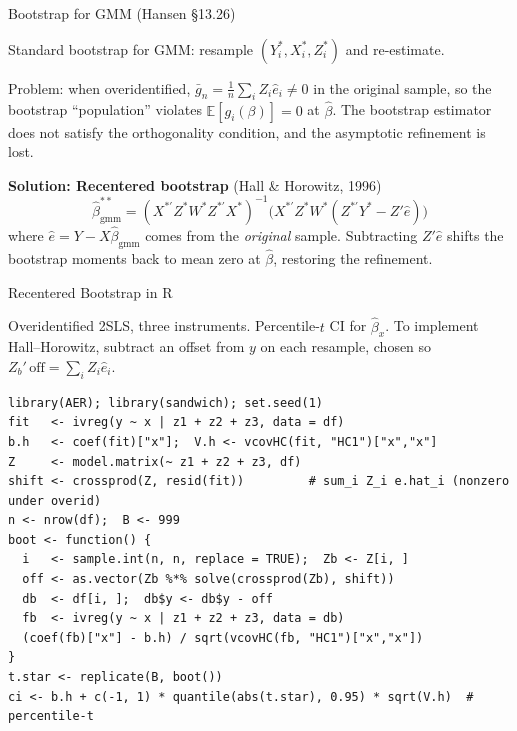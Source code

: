 \documentclass[aspectratio=169, handout]{beamer}
\numberwithin{equation}{section}
\begin{document}
\begin{frame}{Bootstrap for GMM (Hansen \S13.26)}

Standard bootstrap for GMM: resample $(Y_i^*, X_i^*, Z_i^*)$ and re-estimate.

\medskip
\alert{Problem:} when overidentified, $\bar g_n = \tfrac{1}{n}\sum_i Z_i \hat e_i \neq 0$ in the original sample, so the bootstrap ``population'' violates $\mathbb{E}[g_i(\beta)] = 0$ at $\hat\beta$. The bootstrap estimator does not satisfy the orthogonality condition, and the asymptotic refinement is lost.

\medskip
\textbf{Solution: Recentered bootstrap} (Hall \& Horowitz, 1996)
$$\hat\beta_{\text{gmm}}^{**} = (X^{*\prime}Z^*W^*Z^{*\prime}X^*)^{-1}\!\bigl(X^{*\prime}Z^*W^*(Z^{*\prime}Y^* - Z'\hat e)\bigr)$$
where $\hat e = Y - X\hat\beta_{\text{gmm}}$ comes from the \textit{original} sample. Subtracting $Z'\hat e$ shifts the bootstrap moments back to mean zero at $\hat\beta$, restoring the refinement.

\end{frame}

\begin{frame}[fragile]{Recentered Bootstrap in R}

Overidentified 2SLS, three instruments. Percentile-$t$ CI for $\hat\beta_x$. To implement Hall--Horowitz, subtract an offset from $y$ on each resample, chosen so $Z_b'\,\text{off} = \sum_i Z_i \hat e_i$.

\begin{lstlisting}[basicstyle=\ttfamily\scriptsize]
library(AER); library(sandwich); set.seed(1)
fit   <- ivreg(y ~ x | z1 + z2 + z3, data = df)
b.h   <- coef(fit)["x"];  V.h <- vcovHC(fit, "HC1")["x","x"]
Z     <- model.matrix(~ z1 + z2 + z3, df)
shift <- crossprod(Z, resid(fit))         # sum_i Z_i e.hat_i (nonzero under overid)
n <- nrow(df);  B <- 999
boot <- function() {
  i   <- sample.int(n, n, replace = TRUE);  Zb <- Z[i, ]
  off <- as.vector(Zb %*% solve(crossprod(Zb), shift))
  db  <- df[i, ];  db$y <- db$y - off
  fb  <- ivreg(y ~ x | z1 + z2 + z3, data = db)
  (coef(fb)["x"] - b.h) / sqrt(vcovHC(fb, "HC1")["x","x"])
}
t.star <- replicate(B, boot())
ci <- b.h + c(-1, 1) * quantile(abs(t.star), 0.95) * sqrt(V.h)  # percentile-t
\end{lstlisting}

\end{frame}
\end{document}
